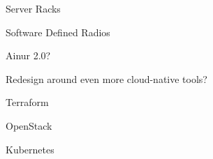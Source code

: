 \begin{outline}
\begin{outline}
\begin{outline}
\begin{outline}
                \item Server Racks
                \item Software Defined Radios
            \end{outline}
            \item Ainur 2.0?
            \begin{outline}
                \item Redesign around even more cloud-native tools?
                \item Terraform
                \item OpenStack
                \item Kubernetes
            \end{outline}
        \end{outline}
    \end{outline}
\end{outline}